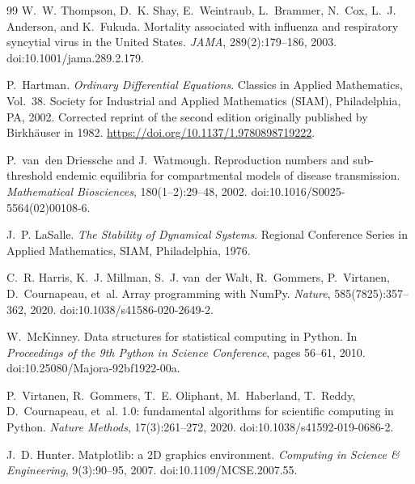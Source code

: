 \documentclass[12pt,a4paper]{article}
\theoremstyle{definition}
\theoremstyle{remark}
\begin{document}
\begin{thebibliography}{99}
W.~W. Thompson, D.~K. Shay, E.~Weintraub, L.~Brammer, N.~Cox,
L.~J. Anderson, and K.~Fukuda.
\newblock Mortality associated with influenza and respiratory syncytial virus in the United States.
\newblock \emph{JAMA}, 289(2):179--186, 2003.
\newblock doi:10.1001/jama.289.2.179.


P.~Hartman.
\newblock \emph{Ordinary Differential Equations}.
\newblock Classics in Applied Mathematics, Vol.~38.
\newblock Society for Industrial and Applied Mathematics (SIAM), Philadelphia, PA, 2002.
\newblock Corrected reprint of the second edition originally published by Birkh\"auser in 1982.
\newblock \url{https://doi.org/10.1137/1.9780898719222}.


P.~van~den Driessche and J.~Watmough.
\newblock Reproduction numbers and sub-threshold endemic equilibria for compartmental models of disease transmission.
\newblock \emph{Mathematical Biosciences}, 180(1--2):29--48, 2002.
\newblock doi:10.1016/S0025-5564(02)00108-6.

J.~P. LaSalle.
\newblock \emph{The Stability of Dynamical Systems}.
\newblock Regional Conference Series in Applied Mathematics, SIAM, Philadelphia, 1976.


C.~R. Harris, K.~J. Millman, S.~J. van~der Walt, R.~Gommers, P.~Virtanen, D.~Cournapeau, et~al.
\newblock Array programming with {NumPy}.
\newblock \emph{Nature}, 585(7825):357--362, 2020.
\newblock doi:10.1038/s41586-020-2649-2.

W.~McKinney.
\newblock Data structures for statistical computing in {P}ython.
\newblock In \emph{Proceedings of the 9th Python in Science Conference}, pages 56--61, 2010.
\newblock doi:10.25080/Majora-92bf1922-00a.

P.~Virtanen, R.~Gommers, T.~E. Oliphant, M.~Haberland, T.~Reddy, D.~Cournapeau, et~al.
 1.0: fundamental algorithms for scientific computing in {P}ython.
\newblock \emph{Nature Methods}, 17(3):261--272, 2020.
\newblock doi:10.1038/s41592-019-0686-2.

J.~D. Hunter.
\newblock Matplotlib: a {2D} graphics environment.
\newblock \emph{Computing in Science \& Engineering}, 9(3):90--95, 2007.
\newblock doi:10.1109/MCSE.2007.55.


\end{thebibliography}
\end{document}
